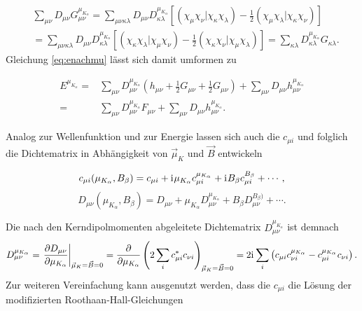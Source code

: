      \begin{equation}
     \begin{aligned}
     &\sum_{\mu\nu}D_{\mu\nu}G_{\mu\nu}^{\mu_{K_\alpha}}=\sum_{\mu\nu\kappa\lambda}D_{\mu\nu}D_{\kappa\lambda}^{\mu_{K_\alpha}}\left[(\chi_\mu\chi_\nu\vert\chi_\kappa\chi_\lambda)-\frac{1}{2}(\chi_\mu\chi_\lambda\vert\chi_\kappa\chi_\nu)\right]\\
     &=\sum_{\mu\nu\kappa\lambda}D_{\mu\nu}D_{\kappa\lambda}^{\mu_{K_\alpha}}\left[(\chi_\kappa\chi_\lambda\vert\chi_\mu\chi_\nu)-\frac{1}{2}(\chi_\kappa\chi_\nu\vert\chi_\mu\chi_\lambda)\right]=\sum_{\kappa\lambda}D_{\kappa\lambda}^{\mu_{K_\alpha}}G_{\kappa\lambda}.
     \end{aligned}
     \end{equation}
     Gleichung \ref{eq:enachmu} lässt sich damit umformen zu

	\begin{equation}
    \begin{aligned}
	  E^{\mu_{K_\alpha}}=&\sum_{\mu\nu}D_{\mu\nu}^{\mu_{K_\alpha}}(h_{\mu\nu}+\frac{1}{2}G_{\mu\nu}+\frac{1}{2}G_{\mu\nu})+\sum_{\mu\nu}D_{\mu\nu}h_{\mu\nu}^{\mu_{K_\alpha}}\\
	  =&\sum_{\mu\nu}D_{\mu\nu}^{\mu_{K_\alpha}}F_{\mu\nu}+\sum_{\mu\nu}D_{\mu\nu}h_{\mu\nu}^{\mu_{K_\alpha}}.
    \end{aligned}
	\end{equation}     
     
     Analog zur Wellenfunktion und zur Energie lassen sich auch die $c_{\mu i}$ und folglich die Dichtematrix in Abhängigkeit von $\vec{\mu}_K$ und $\vec{B}$ entwickeln 
     
     \begin{equation}
     c_{\mu i}(\mu_{K_\alpha},B_\beta)=c_{\mu i}+\mathrm{i}\mkern1mu\mu_{K_\alpha}c_{\mu i}^{\mu_{K_\alpha}}+\mathrm{i}\mkern1mu B_\beta c_{\mu i}^{B_\beta}+\cdots,
     \end{equation}
     \begin{equation}
     D_{\mu\nu}(\mu_{K_\alpha},B_\beta)=D_{\mu\nu}+\mu_{K_\alpha}D_{\mu\nu}^{\mu_{K_\alpha}}+B_\beta D_{\mu\nu}^{B_\beta)}+\cdots.
     \end{equation}
     
     Die nach den Kerndipolmomenten abgeleitete Dichtematrix $D_{\mu\nu}^{\mu_{K_\alpha}}$ ist demnach
     \begin{equation}
     D_{\mu\nu}^{\mu_{K_\alpha}}=\left.\frac{\partial D_{\mu\nu}}{\partial \mu_{K_\alpha}}\right\vert_{\vec{\mu}_K=\vec{B}=0}=\frac{\partial}{\partial \mu_{K_\alpha}}\left(2\sum_i c_{\mu i}^*c_{\nu i}\right)_{\vec{\mu}_K=\vec{B}=0}=2\mathrm{i}\mkern1mu \sum_i\left(c_{\mu i}c_{\nu i}^{\mu_{K_\alpha}}-c_{\mu i}^{\mu_{K_\alpha}}c_{\nu i}\right).
     \end{equation}
     Zur weiteren Vereinfachung kann ausgenutzt werden, dass die $c_{\mu i}$ die Lösung der modifizierten Roothaan-Hall-Gleichungen
     
